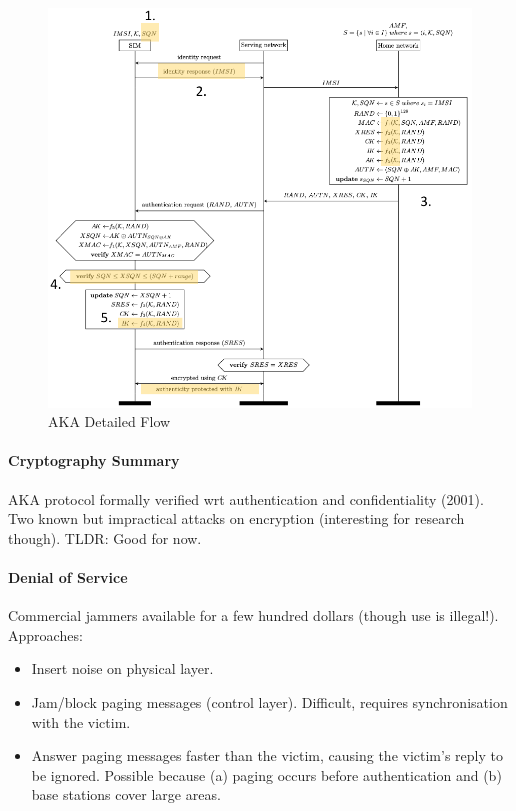 \begin{figure}
	\centering
	\includegraphics[scale=0.7]{images/10-3g-aka-details.png}
	\caption{AKA Detailed Flow}
	\label{fig:3g-aka-details}
\end{figure}

\paragraph{Cryptography Summary}
AKA protocol formally verified wrt authentication and confidentiality (2001).
Two known but impractical attacks on encryption (interesting for research though).
TLDR: Good for now.

\paragraph{Denial of Service}
Commercial jammers available for a few hundred dollars (though use is illegal!).
\\
Approaches:
\begin{itemize}
	\item Insert noise on physical layer.
	\item Jam/block paging messages (control layer). Difficult, requires synchronisation with the victim.
	\item Answer paging messages faster than the victim, causing the victim's reply to be ignored.
	Possible because (a) paging occurs before authentication and (b) base stations cover large areas.
\end{itemize}

